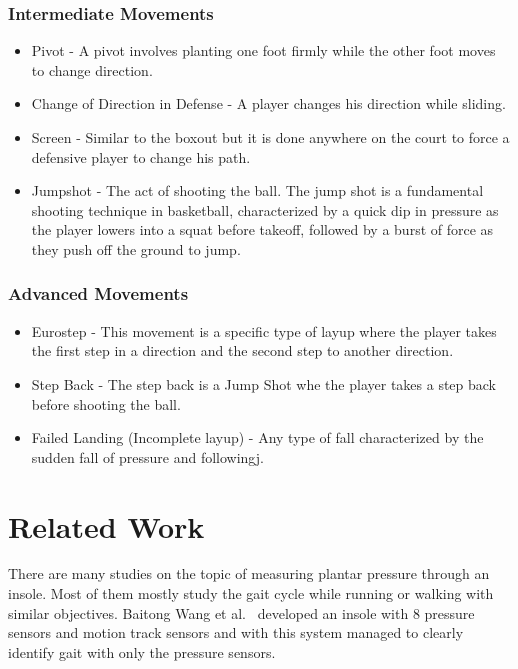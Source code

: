 \subsubsection{Intermediate Movements}
\label{sssec:intermediate_movements}

\begin{itemize}
  \item Pivot - A pivot involves planting one foot firmly while the other foot moves to change direction.
  \item Change of Direction in Defense - A player changes his direction while sliding.
  \item Screen - Similar to the boxout but it is done anywhere on the court to force a defensive player to change his path.
  \item Jumpshot - The act of shooting the ball. The jump shot is a fundamental shooting technique in basketball, characterized by a quick dip in pressure as the player lowers into a squat before takeoff, followed by a burst of force as they push off the ground to jump.
\end{itemize}

\subsubsection{Advanced Movements}
\label{sssec:advanced_movements}

\begin{itemize}
  \item Eurostep - This movement is a specific type of layup where the player takes the first step in a direction and the second step to another direction.
  \item Step Back - The step back is a Jump Shot whe the player takes a step back before shooting the ball.
  \item Failed Landing (Incomplete layup) - Any type of fall characterized by the sudden fall of pressure and followingj.

\end{itemize}

\newpage
\section{Related Work}
\label{sec:related_work}

There are many studies on the topic of measuring plantar pressure through an insole. Most of them mostly study the gait cycle while running or walking with similar objectives. 
Baitong Wang et al.~\cite{freewalker} developed an insole with 8 pressure sensors and motion track sensors and with this system managed to clearly identify gait with only the pressure 
sensors.

